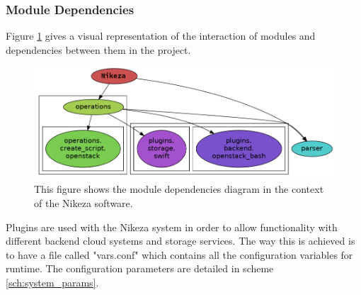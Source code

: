\subsubsection{Module Dependencies}

Figure \ref{fig:module_deps} gives a visual representation of the interaction of modules and dependencies between them in the project.

\begin{figure}[ht!]
\centering
\includegraphics[width=\textwidth]{Figures/3_module_deps_new.png}
\decoRule
\caption[Nikeza Software Module Dependencies]{This figure shows the module dependencies diagram in the context of the Nikeza software.}
\label{fig:module_deps}
\end{figure}

Plugins are used with the Nikeza system in order to allow functionality with different backend cloud systems and storage services. The way this is achieved is to have a file called "vars.conf" which contains all the configuration variables for runtime. The configuration parameters are detailed in scheme \ref{sch:system_params}.

